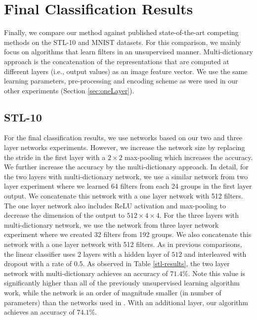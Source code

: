 \documentclass{article} \usepackage{iclr2016_workshop,times}
\begin{document}
\section{Final Classification Results}
\label{sec:results}

Finally, we compare our method against published state-of-the-art competing methods on the STL-10 and MNIST datasets.
For this comparison, we mainly focus on algorithms that learn filters in an unsupervised manner. Multi-dictionary approach \citep{coates2011selecting,lin2014stable} is the concatenation of the representations that are computed at different layers (i.e., output values) as an image feature vector. 
We use the same learning parameters, pre-processing and encoding scheme as were used in our other experiments (Section \ref{sec:oneLayer}). 

\subsection{STL-10}
For the final classification results, we use networks based on our two and three layer networks experiments. However, we increase the network size by replacing the stride in the first layer with a $2\times2$ max-pooling which increases the accuracy. We further increase the accuracy by the multi-dictionary approach.
In detail, for the two layers with multi-dictionary network, we use a similar network from two layer experiment where we learned 64 filters from each 24 groups in the first layer output.
We concatenate this network with a one layer network with 512 filters. The one layer network also includes ReLU activation and max-pooling to decrease the dimension of the output to $512\times4\times4$.
For the three layers with multi-dictionary network, we use the network from three layer network experiment  where we created 32 filters from 192 groups. We also concatenate this network with a one layer network with 512 filters.
As in previous comparisons, the linear classifier uses 2 layers with a hidden layer of $512$ and interleaved with dropout \citep{hinton2012improving} with a rate of $0.5$. As observed in Table \ref{stl-results}, the two layer network with multi-dictionary achieves an accuracy of $71.4 \%$. Note this value is significantly higher than all of the previously unsupervised learning algorithm work, while the network is an order of magnitude smaller (in number of parameters) than the networks used in \citep{coates2011selecting,lin2014stable}. With an additional layer, our algorithm achieves an accuracy of $74.1 \%$.
\end{document}
